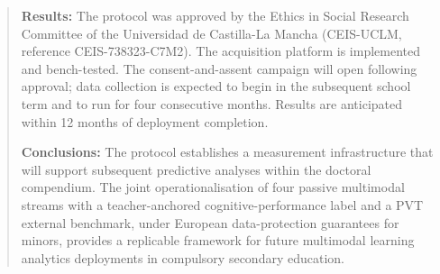 \begin{abstract}
\noindent \textbf{Results:} The protocol was approved by the Ethics in Social Research Committee of the Universidad de Castilla-La Mancha (CEIS-UCLM, reference CEIS-738323-C7M2). The acquisition platform is implemented and bench-tested. The consent-and-assent campaign will open following approval; data collection is expected to begin in the subsequent school term and to run for four consecutive months. Results are anticipated within 12 months of deployment completion.

\noindent \textbf{Conclusions:} The protocol establishes a measurement infrastructure that will support subsequent predictive analyses within the doctoral compendium. The joint operationalisation of four passive multimodal streams with a teacher-anchored cognitive-performance label and a PVT external benchmark, under European data-protection guarantees for minors, provides a replicable framework for future multimodal learning analytics deployments in compulsory secondary education.

\end{abstract}
